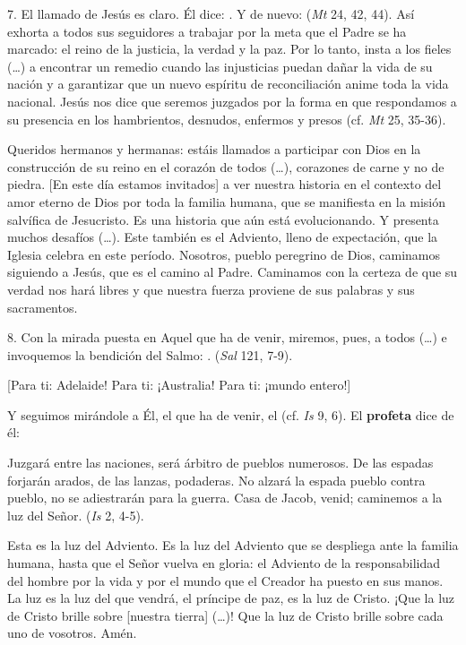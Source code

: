 \begin{body}
	7. El llamado de Jesús es claro. Él dice: . Y de nuevo:  (\emph{Mt} 24, 42, 44). Así exhorta a todos sus seguidores a trabajar por la meta que el Padre se ha marcado: el reino de la justicia, la verdad y la paz. Por lo tanto, insta a los fieles (\ldots{}) a encontrar un remedio cuando las injusticias puedan dañar la vida de su nación y a garantizar que un nuevo espíritu de reconciliación anime toda la vida nacional. Jesús nos dice que seremos juzgados por la forma en que respondamos a su presencia en los hambrientos, desnudos, enfermos y presos (cf. \emph{Mt} 25, 35-36).
	
	Queridos hermanos y hermanas: estáis llamados a participar con Dios en la construcción de su reino en el corazón de todos (\ldots{}), corazones de carne y no de piedra. {[}En este día estamos invitados{]} a ver nuestra historia en el contexto del amor eterno de Dios por toda la familia humana, que se manifiesta en la misión salvífica de Jesucristo. Es una historia que aún está evolucionando. Y presenta muchos desafíos (\ldots{}). Este también es el Adviento, lleno de expectación, que la Iglesia celebra en este período. Nosotros, pueblo peregrino de Dios, caminamos siguiendo a Jesús, que es el camino al Padre. Caminamos con la certeza de que su verdad nos hará libres y que nuestra fuerza proviene de sus palabras y sus sacramentos.
	
	8. Con la mirada puesta en Aquel que ha de venir, miremos, pues, a todos (\ldots{}) e invoquemos la bendición del Salmo: . (\emph{Sal} 121, 7-9).
	
	{[}Para ti: Adelaide! Para ti: ¡Australia! Para ti: ¡mundo entero!{]} 
	
	Y seguimos mirándole a Él, el que ha de venir, el  (cf. \emph{Is} 9, 6). El \textbf{profeta} dice de él: 
	
	\begin{bodyprose}
	Juzgará entre las naciones, 
	será árbitro de pueblos numerosos. 
	De las espadas forjarán arados, 
	de las lanzas, podaderas. 
	No alzará la espada pueblo contra pueblo, 
	no se adiestrarán para la guerra. 
	Casa de Jacob, venid; 
	caminemos a la luz del Señor. 
	(\emph{Is} 2, 4-5). 
	\end{bodyprose}
	
	Esta es la luz del Adviento. Es la luz del Adviento que se despliega ante la familia humana, hasta que el Señor vuelva en gloria: el Adviento de la responsabilidad del hombre por la vida y por el mundo que el Creador ha puesto en sus manos. La luz es la luz del que vendrá, el príncipe de paz, es la luz de Cristo. ¡Que la luz de Cristo brille sobre {[}nuestra tierra{]} (\ldots{})! Que la luz de Cristo brille sobre cada uno de vosotros. Amén. 
\end{body} 

